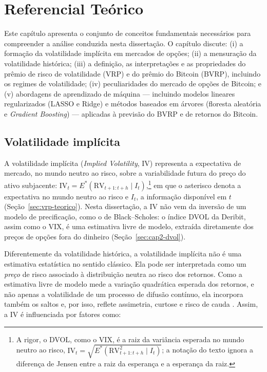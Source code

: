 \chapter{Referencial Teórico}
\label{chap:referencial}

Este capítulo apresenta o conjunto de conceitos fundamentais necessários para
compreender a análise conduzida nesta dissertação. O capítulo discute: (i) a
formação da volatilidade implícita em mercados de opções; (ii) a mensuração da
volatilidade histórica; (iii) a definição, as interpretações e as propriedades
do prêmio de risco de volatilidade (VRP) e do prêmio do Bitcoin (BVRP),
incluindo os regimes de volatilidade; (iv) peculiaridades do mercado de opções
de Bitcoin; e (v) abordagens de aprendizado de máquina --- incluindo modelos
lineares regularizados (LASSO e Ridge) e métodos baseados em árvores (floresta
aleatória e \textit{Gradient Boosting}) --- aplicadas à previsão do BVRP e de
retornos do Bitcoin.

\section{Volatilidade implícita}

A volatilidade implícita (\textit{Implied Volatility}, IV) representa a
expectativa de mercado, no mundo neutro ao risco, sobre a variabilidade futura
do preço do ativo subjacente: $\text{IV}_t = E^*(\text{RV}_{t+1:t+h} \mid I_t)$,\footnote{A
rigor, o DVOL, como o VIX, é a raiz da variância esperada no mundo neutro ao
risco, $\text{IV}_t = \sqrt{E^*(\text{RV}^2_{t+1:t+h} \mid I_t)}$; a notação do
texto ignora a diferença de Jensen entre a raiz da esperança e a esperança da
raiz.}
em que o asterisco denota a expectativa no mundo neutro ao risco e $I_t$, a
informação disponível em $t$ (Seção~\ref{sec:vrp-teorico}). Nesta dissertação,
a IV não vem da inversão de um modelo de precificação, como o de Black--Scholes:
o índice DVOL da Deribit, assim como o VIX, é uma estimativa livre de modelo,
extraída diretamente dos preços de opções fora do dinheiro
\citep{carr2009variance, cboe2019vix} (Seção~\ref{sec:cap2-dvol}).

Diferentemente da volatilidade histórica, a volatilidade implícita não é uma
estimativa estatística no sentido clássico. Ela pode ser interpretada como um
\textit{preço} de risco associado à distribuição neutra ao risco dos retornos.
Como a estimativa livre de modelo mede a variação quadrática esperada dos
retornos, e não apenas a volatilidade de um processo de difusão contínuo, ela
incorpora também os saltos e, por isso, reflete assimetria, curtose e risco de
cauda \citep{carr2009variance}. Assim, a IV é influenciada por fatores como:

